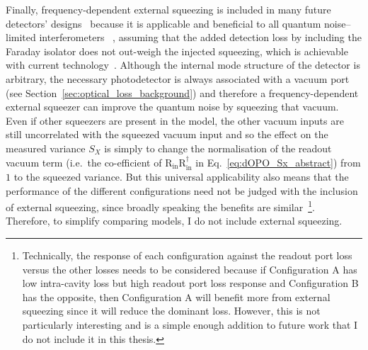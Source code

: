 Finally, frequency-dependent external squeezing is included in many future detectors' designs~\cite{} because it is applicable and beneficial to all quantum noise--limited interferometers~\cite{} , assuming that the added detection loss by including the Faraday isolator does not out-weigh the injected squeezing, which is achievable with current technology~\cite{}. Although the internal mode structure of the detector is arbitrary, the necessary photodetector is always associated with a vacuum port (see Section~\ref{sec:optical_loss_background}) and therefore a frequency-dependent external squeezer can improve the quantum noise by squeezing that vacuum. Even if other squeezers are present in the model, the other vacuum inputs are still uncorrelated with the squeezed vacuum input and so the effect on the measured variance $S_X$ is simply to change the normalisation of the readout vacuum term (i.e.\ the co-efficient of $\text{R}_\text{in} \text{R}_\text{in}^\dag$ in Eq.~\ref{eq:dOPO_Sx_abstract}) from $1$ to the squeezed variance. But this universal applicability also means that the performance of the different configurations need not be judged with the inclusion of external squeezing, since broadly speaking the benefits are similar~\footnote{Technically, the response of each configuration against the readout port loss versus the other losses needs to be considered because if Configuration A has low intra-cavity loss but high readout port loss response and Configuration B has the opposite, then Configuration A will benefit more from external squeezing since it will reduce the dominant loss. However, this is not particularly interesting and is a simple enough addition to future work that I do not include it in this thesis.}. Therefore, to simplify comparing models, I do not include external squeezing. %





